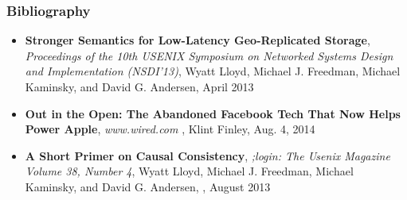 \documentclass{beamer}
\begin{document}
\begin{frame}
\frametitle{Bibliography}


\begin{itemize}
\item \textbf{Stronger Semantics for Low-Latency Geo-Replicated Storage}, 
\textit{Proceedings of the 10th USENIX Symposium on Networked Systems Design and Implementation (NSDI’13)}, 
Wyatt Lloyd, Michael J. Freedman, Michael Kaminsky, and David G. Andersen, 
April 2013

\item \textbf{Out in the Open: The Abandoned Facebook Tech That Now Helps Power Apple}, 
\textit{www.wired.com}
, Klint Finley, Aug. 4, 2014

\item \textbf{A Short Primer on Causal Consistency}, 
\textit{;login: The Usenix Magazine Volume 38, Number 4}, 
Wyatt Lloyd, Michael J. Freedman, Michael Kaminsky, and David G. Andersen, , August 2013


\end{itemize}  
\end{frame}
\end{document}
